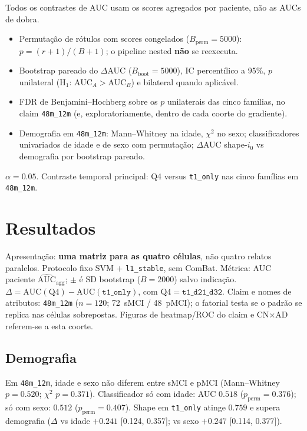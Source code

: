 \documentclass[review]{elsarticle}
\newcommand{\code}[1]{\texttt{#1}}
\begin{document}
Todos os contrastes de AUC usam os scores agregados por paciente,
não as AUCs de dobra.
\begin{itemize}
	\item Permutação de rótulos com scores congelados ($B_{\mathrm{perm}}=5000$):
	$p=(r+1)/(B+1)$; o pipeline nested \textbf{não} se reexecuta.
	\item Bootstrap pareado do $\Delta$AUC ($B_{\mathrm{boot}}=5000$),
	IC percentílico a 95\%, $p$ unilateral
	(H$_1$: AUC$_A>$AUC$_B$) e bilateral quando aplicável.
	\item FDR de Benjamini--Hochberg sobre os $p$ unilaterais das cinco famílias,
	no claim \code{48m\_12m} (e, exploratoriamente, dentro de cada coorte do gradiente).
	\item Demografia em \code{48m\_12m}: Mann--Whitney na idade, $\chi^2$ no sexo;
	classificadores univariados de idade e de sexo com permutação;
	$\Delta$AUC shape-$i_0$ vs demografia por bootstrap pareado.
\end{itemize}
$\alpha=0.05$.
Contraste temporal principal: Q4 versus \code{t1\_only} nas cinco famílias
em \code{48m\_12m}.

\section{Resultados}\label{sec:Results}

Apresentação: \textbf{uma matriz para as quatro células}, não quatro relatos paralelos.
Protocolo fixo SVM $+$ \code{l1\_stable}, sem ComBat.
Métrica: AUC paciente $\widehat{\mathrm{AUC}}_{\mathrm{agg}}$; $\pm$ é SD bootstrap ($B=2000$) salvo indicação.
$\Delta=\mathrm{AUC}(\mathrm{Q4})-\mathrm{AUC}(\code{t1\_only})$, com $\mathrm{Q4}=\code{t1\_d21\_d32}$.
Claim e nomes de atributos: \code{48m\_12m} ($n=120$; 72~sMCI / 48~pMCI); o fatorial testa se o padrão se replica nas células sobrepostas.
Figuras de heatmap/ROC do claim e CN$\times$AD referem-se a esta coorte.

\subsection{Demografia}
\label{subsec:demo}

Em \code{48m\_12m}, idade e sexo não diferem entre sMCI e pMCI
(Mann--Whitney $p=0.520$; $\chi^2$ $p=0.371$).
Classificador só com idade: AUC $0.518$ ($p_{\mathrm{perm}}=0.376$);
só com sexo: $0.512$ ($p_{\mathrm{perm}}=0.407$).
Shape em \code{t1\_only} atinge $0.759$ e supera demografia
($\Delta$ vs idade $+0.241$ [0.124, 0.357]; vs sexo $+0.247$ [0.114, 0.377]).
\end{document}

